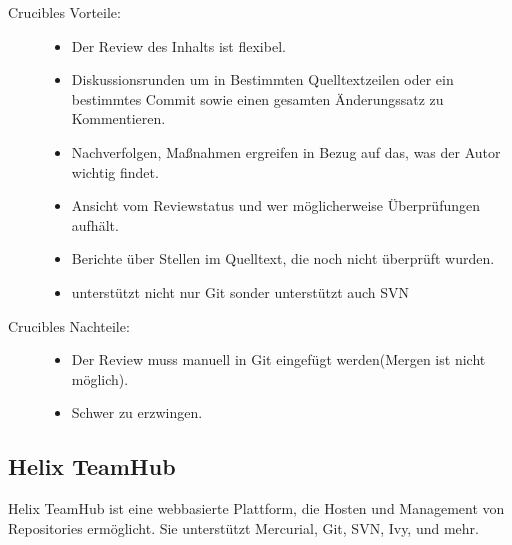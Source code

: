 \begin{description}
	\item [Crucibles Vorteile:] \hfill
	\begin{itemize}
		\item Der Review des Inhalts ist flexibel.
		\item Diskussionsrunden um in Bestimmten Quelltextzeilen oder ein bestimmtes Commit sowie einen gesamten Änderungssatz zu Kommentieren.
		\item Nachverfolgen, Maßnahmen ergreifen in Bezug auf das, was der Autor wichtig findet.
		\item Ansicht vom Reviewstatus und wer möglicherweise Überprüfungen aufhält.
		\item Berichte über Stellen im Quelltext, die noch nicht überprüft wurden.
		\item unterstützt nicht nur Git sonder unterstützt auch \ac{SVN}
	\end{itemize}
	
	\item [Crucibles Nachteile:] \hfill
	\begin{itemize}
		\item Der Review muss manuell in Git eingefügt werden(Mergen ist nicht möglich).
		\item Schwer zu erzwingen.
	\end{itemize}
\end{description}

\subsection{Helix TeamHub}
\label{subsec:HelixTeamHub}

Helix TeamHub ist eine webbasierte Plattform, die Hosten und Management von Repositories ermöglicht. Sie unterstützt Mercurial, Git, \ac{SVN}, Ivy, und mehr.

